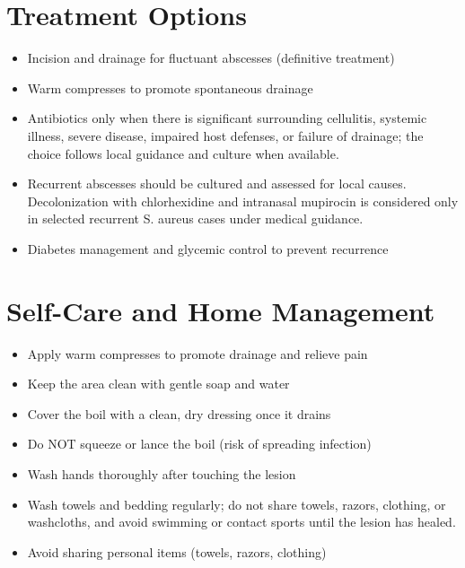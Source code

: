 \section*{Treatment Options}
\begin{itemize}
\item Incision and drainage for fluctuant abscesses (definitive treatment)
\item Warm compresses to promote spontaneous drainage
\item Antibiotics only when there is significant surrounding cellulitis, systemic illness, severe disease, impaired host defenses, or failure of drainage; the choice follows local guidance and culture when available.
\item Recurrent abscesses should be cultured and assessed for local causes. Decolonization with chlorhexidine and intranasal mupirocin is considered only in selected recurrent S. aureus cases under medical guidance.
\item Diabetes management and glycemic control to prevent recurrence
\end{itemize}

\section*{Self-Care and Home Management}
\begin{itemize}
\item Apply warm compresses to promote drainage and relieve pain
\item Keep the area clean with gentle soap and water
\item Cover the boil with a clean, dry dressing once it drains
\item Do NOT squeeze or lance the boil (risk of spreading infection)
\item Wash hands thoroughly after touching the lesion
\item Wash towels and bedding regularly; do not share towels, razors, clothing, or washcloths, and avoid swimming or contact sports until the lesion has healed.
\item Avoid sharing personal items (towels, razors, clothing)
\end{itemize}


